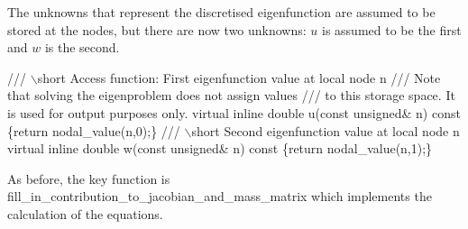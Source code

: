 The unknowns that represent the discretised eigenfunction are assumed to be stored at the nodes, but there are now two unknowns\+: $u$ is assumed to be the first and $w$ is the second.


\begin{DoxyCodeInclude}
 \textcolor{comment}{/// \(\backslash\)short Access function: First eigenfunction value at local node n}
\textcolor{comment}{ /// Note that solving the eigenproblem does not assign values}
\textcolor{comment}{}\textcolor{comment}{ /// to this storage space. It is used for output purposes only.}
\textcolor{comment}{} \textcolor{keyword}{virtual} \textcolor{keyword}{inline} \textcolor{keywordtype}{double} u(\textcolor{keyword}{const} \textcolor{keywordtype}{unsigned}& n)\textcolor{keyword}{ const }
\textcolor{keyword}{  }\{\textcolor{keywordflow}{return} nodal\_value(n,0);\}
\textcolor{comment}{}
\textcolor{comment}{ /// \(\backslash\)short Second eigenfunction value at local node n}
\textcolor{comment}{} \textcolor{keyword}{virtual} \textcolor{keyword}{inline} \textcolor{keywordtype}{double} w(\textcolor{keyword}{const} \textcolor{keywordtype}{unsigned}& n)\textcolor{keyword}{ const }
\textcolor{keyword}{  }\{\textcolor{keywordflow}{return} nodal\_value(n,1);\}

\end{DoxyCodeInclude}


As before, the key function is {\ttfamily fill\+\_\+in\+\_\+contribution\+\_\+to\+\_\+jacobian\+\_\+and\+\_\+mass\+\_\+matrix} which implements the calculation of the equations.


